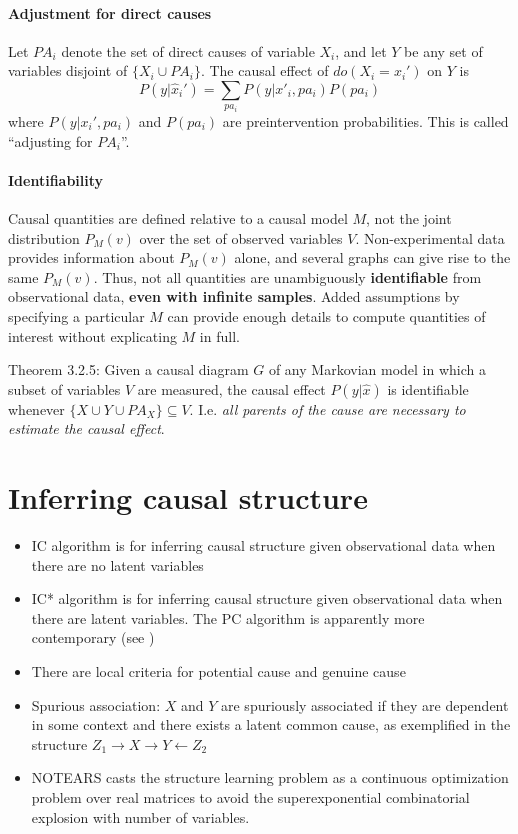 \documentclass[11pt]{article}
\numberwithin{equation}{section}
\begin{document}
\paragraph{Adjustment for direct causes} 
Let $PA_i$ denote the set of direct causes of variable $X_i$, and let $Y$ be any set of variables disjoint of $\{X_i \cup PA_i \}$. The causal effect of $do(X_i=x_i')$ on $Y$ is
\begin{equation}
P(y|\hat{x}_i') = \sum_{pa_i} P(y | x'_i, pa_i) P(pa_i)
\end{equation}
where $P(y|x_i', pa_i)$ and $P(pa_i)$ are preintervention probabilities. This is called ``adjusting for $PA_i$''.


\paragraph{Identifiability}
Causal quantities are defined relative to a causal model $M$, not the joint distribution $P_M(v)$ over the set of observed variables $V$. Non-experimental data provides information about $P_M(v)$ alone, and several graphs can give rise to the same $P_M(v)$. Thus, not all quantities are unambiguously \textbf{identifiable} from observational data, \textbf{even with infinite samples}. Added assumptions by specifying a particular $M$ can provide enough details to compute quantities of interest without explicating $M$ in full.

Theorem 3.2.5: Given a causal diagram $G$ of any Markovian model in which a subset of variables $V$ are measured, the causal effect $P(y|\hat{x})$ is identifiable whenever $\{X \cup Y \cup PA_X\} \subseteq V$. I.e. \textit{all parents of the cause are necessary to estimate the causal effect}.

\section{Inferring causal structure}
\begin{itemize}
\item IC algorithm is for inferring causal structure given observational data when there are no latent variables
\item IC* algorithm is for inferring causal structure given observational data when there are latent variables. The PC algorithm is apparently more contemporary (see \cite{spirtes10})
\item There are local criteria for potential cause and genuine cause
\item Spurious association: $X$ and $Y$ are spuriously associated if they are dependent in some context and there exists a latent common cause, as exemplified in the structure $Z_1 \rightarrow X \rightarrow Y \leftarrow Z_2$
\item NOTEARS \citep{zheng18} casts the structure learning problem as a continuous optimization problem over real matrices to avoid the superexponential combinatorial explosion with number of variables.
\end{itemize}
\end{document}
